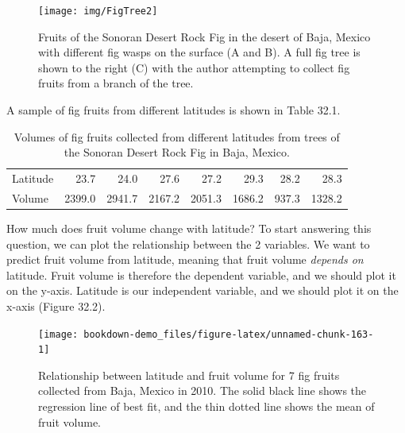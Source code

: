 \documentclass[
]{scrbook}
\begin{document}
\begin{figure}
\texttt{[image: img/FigTree2]} \caption{Fruits of the Sonoran Desert Rock Fig in the desert of Baja, Mexico with different fig wasps on the surface (A and B). A full fig tree is shown to the right (C) with the author attempting to collect fig fruits from a branch of the tree.}\label{fig:unnamed-chunk-161}
\end{figure}

A sample of fig fruits from different latitudes is shown in Table 32.1.

\begin{longtable}[]{@{}lrrrrrrr@{}}
\caption{\label{tab:unnamed-chunk-162}Volumes of fig fruits collected from different latitudes from trees of the Sonoran Desert Rock Fig in Baja, Mexico.}\tabularnewline
\toprule
\endhead
Latitude & 23.7 & 24.0 & 27.6 & 27.2 & 29.3 & 28.2 & 28.3 \\
Volume & 2399.0 & 2941.7 & 2167.2 & 2051.3 & 1686.2 & 937.3 & 1328.2 \\
\bottomrule
\end{longtable}

How much does fruit volume change with latitude?
To start answering this question, we can plot the relationship between the 2 variables.
We want to predict fruit volume from latitude, meaning that fruit volume \emph{depends on} latitude.
Fruit volume is therefore the dependent variable, and we should plot it on the y-axis.
Latitude is our independent variable, and we should plot it on the x-axis (Figure 32.2).

\begin{figure}
\texttt{[image: bookdown-demo\_files/figure-latex/unnamed-chunk-163-1]} \caption{Relationship between latitude and fruit volume for 7 fig fruits collected from Baja, Mexico in 2010. The solid black line shows the regression line of best fit, and the thin dotted line shows the mean of fruit volume.}\label{fig:unnamed-chunk-163}
\end{figure}
\end{document}
